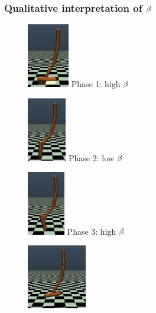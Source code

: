 \subsubsection{Qualitative interpretation of $\beta$ }
\begin{figure}[h]
    \centering
    \begin{minipage}[b]{0.18\linewidth}
    \centering
    \includegraphics[width=\textwidth,height=2.8cm]{fig/phase_0.png}
    Phase 1: high $\beta$
    \label{fig:phase_0}
    \end{minipage}
    \hspace{0.02cm}
    \begin{minipage}[b]{0.18\linewidth}
    \centering
    \includegraphics[width=\textwidth,height=2.8cm]{fig/phase_1.png}
    Phase 2: low $\beta$
    \label{fig:phase_1}
    \end{minipage}
    \hspace{0.02cm}
    \begin{minipage}[b]{0.18\linewidth}
    \centering
    \includegraphics[width=\textwidth,height=2.8cm]{fig/phase_2.png}
    Phase 3: high $\beta$
    \label{fig:phase_2}
    \end{minipage}
    \hspace{0.02cm}
    \begin{minipage}[b]{0.18\linewidth}
    \centering
    \includegraphics[width=\textwidth,height=2.8cm]{fig/phase_3.png}

\end{minipage}
\end{figure}
